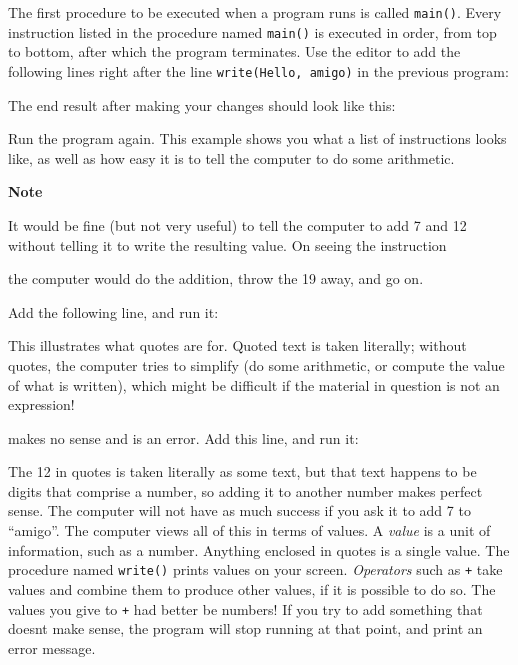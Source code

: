 The first procedure to be executed when a program runs is called
\texttt{main()}. Every instruction listed in the procedure named
\texttt{main()} is executed in order, from top to bottom, after which
the program terminates. Use the editor to add the following lines right
after the line \texttt{write({\textquotedbl}Hello,
amigo{\textquotedbl})} in the previous program:


\noindent The end result after making your changes should look like this:


Run the program again. This example shows you what a list of
instructions looks like, as well as how easy it is to tell the computer
to do some arithmetic.

{\sffamily\bfseries
Note}

{\sffamily
It would be fine (but not very useful) to tell the computer to add 7 and
12 without telling it to write the resulting value. On seeing the
instruction}


\noindent
the computer would do the addition, throw the 19 away, and go on.

Add the following line, and run it:


This illustrates what quotes are for. Quoted text is taken
literally; without quotes, the computer tries to simplify (do
some arithmetic, or compute the value of what is written), which might
be difficult if the material in question is not an expression!


\noindent makes no sense and is an error. Add this line, and run it:


The 12 in quotes is taken literally as some text, but that text happens
to be digits that comprise a number, so adding it to another number
makes perfect sense. The computer will not have as much success if you
ask it to add 7 to {\textquotedblleft}amigo{\textquotedblright}. The
computer views all of this in terms of values. A \textit{value} is a
unit of information, such as a number. Anything enclosed in quotes is a
single value. The procedure named \texttt{write()}
prints values on your screen. \textit{Operators} such as \texttt{+}
take values and combine them to produce other values, if it is possible
to do so. The values you give to \texttt{+} had better be numbers! If
you try to add something that doesn{\textquotesingle}t make sense, the
program will stop running at that point, and print an error message.

